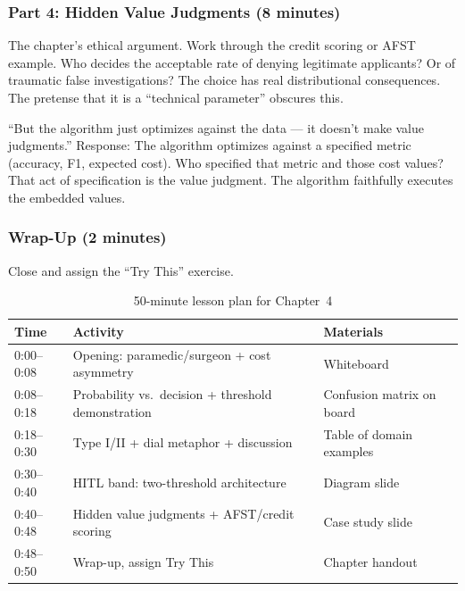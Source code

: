 \subsubsection{Part 4: Hidden Value Judgments (8 minutes)}

The chapter's ethical argument. Work through the credit scoring or AFST example. Who decides the acceptable rate of denying legitimate applicants? Or of traumatic false investigations? The choice has real distributional consequences. The pretense that it is a ``technical parameter'' obscures this.

\begin{cautionbox}
``But the algorithm just optimizes against the data --- it doesn't make value judgments.'' Response: The algorithm optimizes against a specified metric (accuracy, F1, expected cost). Who specified that metric and those cost values? That act of specification is the value judgment. The algorithm faithfully executes the embedded values.
\end{cautionbox}

\subsubsection{Wrap-Up (2 minutes)}
Close and assign the ``Try This'' exercise.

\begin{table}[htbp]
\caption{50-minute lesson plan for Chapter~4}
\label{tab:lesson-plan-ch04}
\centering
\begin{tabular}{@{}p{2.5cm}p{6cm}p{4cm}@{}}
\toprule
\textbf{Time} & \textbf{Activity} & \textbf{Materials} \\
\midrule
0:00--0:08 & Opening: paramedic/surgeon + cost asymmetry & Whiteboard \\
0:08--0:18 & Probability vs.\ decision + threshold demonstration & Confusion matrix on board \\
0:18--0:30 & Type I/II + dial metaphor + discussion & Table of domain examples \\
0:30--0:40 & HITL band: two-threshold architecture & Diagram slide \\
0:40--0:48 & Hidden value judgments + AFST/credit scoring & Case study slide \\
0:48--0:50 & Wrap-up, assign Try This & Chapter handout \\
\bottomrule
\end{tabular}
\end{table}

